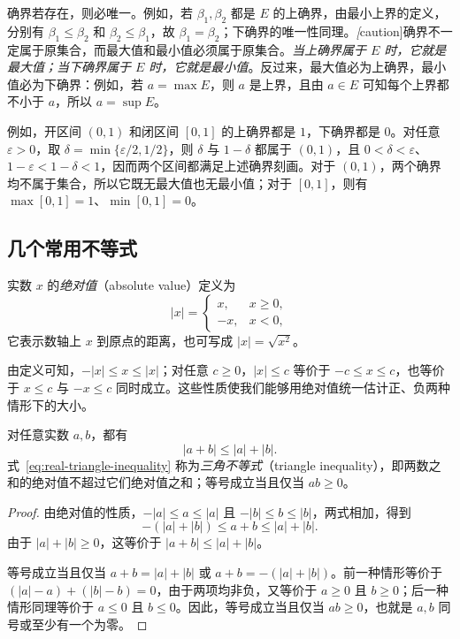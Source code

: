 \documentclass[UTF8,12pt,a4paper,fontset=fandol]{ctexbook}
\begin{document}
确界若存在，则必唯一。例如，若 $\beta_1,\beta_2$ 都是 $E$ 的上确界，由最小上界的定义，分别有 $\beta_1\leq\beta_2$ 和 $\beta_2\leq\beta_1$，故 $\beta_1=\beta_2$；下确界的唯一性同理。\emph[caution]{确界不一定属于原集合，而最大值和最小值必须属于原集合。}\emph{当上确界属于 $E$ 时，它就是最大值；当下确界属于 $E$ 时，它就是最小值}。反过来，最大值必为上确界，最小值必为下确界：例如，若 $a=\max E$，则 $a$ 是上界，且由 $a\in E$ 可知每个上界都不小于 $a$，所以 $a=\sup E$。

例如，开区间 $(0,1)$ 和闭区间 $[0,1]$ 的上确界都是 $1$，下确界都是 $0$。对任意 $\varepsilon>0$，取 $\delta=\min\{\varepsilon/2,1/2\}$，则 $\delta$ 与 $1-\delta$ 都属于 $(0,1)$，且 $0<\delta<\varepsilon$、$1-\varepsilon<1-\delta<1$，因而两个区间都满足上述确界刻画。对于 $(0,1)$，两个确界均不属于集合，所以它既无最大值也无最小值；对于 $[0,1]$，则有 $\max[0,1]=1$、$\min[0,1]=0$。

\subsection{几个常用不等式}
\label{subsec:common-inequalities}

\begin{definition}
\label{def:real-absolute-value}
实数 $x$ 的\emph{绝对值}（absolute value）定义为
\[
    |x|=
    \begin{cases}
        x, & x\geq 0,\\
        -x, & x<0,
    \end{cases}
\]
它表示数轴上 $x$ 到原点的距离，也可写成 $|x|=\sqrt{x^2}$。
\end{definition}

由定义可知，$-|x|\leq x\leq |x|$；对任意 $c\geq 0$，$|x|\leq c$ 等价于 $-c\leq x\leq c$，也等价于 $x\leq c$ 与 $-x\leq c$ 同时成立。这些性质使我们能够用绝对值统一估计正、负两种情形下的大小。

\begin{proposition}[三角不等式]
\label{prop:real-triangle-inequality}
对任意实数 $a,b$，都有
\begin{equation}
    |a+b|\leq |a|+|b|.
    \label{eq:real-triangle-inequality}
\end{equation}
式~\eqref{eq:real-triangle-inequality} 称为\emph{三角不等式}（triangle inequality），即两数之和的绝对值不超过它们绝对值之和；等号成立当且仅当 $ab\geq 0$。
\end{proposition}

\begin{proof}
由绝对值的性质，$-|a|\leq a\leq |a|$ 且 $-|b|\leq b\leq |b|$，两式相加，得到
\[
    -(|a|+|b|)\leq a+b\leq |a|+|b|.
\]
由于 $|a|+|b|\geq 0$，这等价于 $|a+b|\leq |a|+|b|$。

等号成立当且仅当 $a+b=|a|+|b|$ 或 $a+b=-(|a|+|b|)$。前一种情形等价于 $(|a|-a)+(|b|-b)=0$，由于两项均非负，又等价于 $a\geq 0$ 且 $b\geq 0$；后一种情形同理等价于 $a\leq 0$ 且 $b\leq 0$。因此，等号成立当且仅当 $ab\geq 0$，也就是 $a,b$ 同号或至少有一个为零。
\end{proof}
\end{document}
